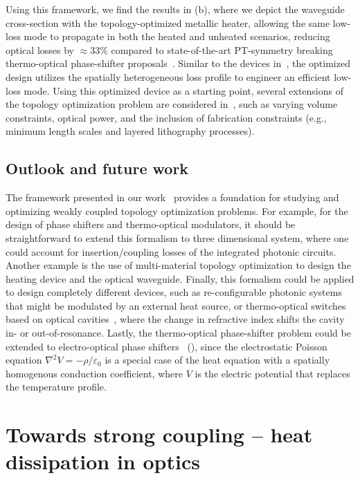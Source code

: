 Using this framework, we find the results in  (b), where we depict the waveguide cross-section with the topology-optimized metallic heater,
allowing the same low-loss mode to propagate in both the heated and unheated scenarios,
reducing optical losses by $\approx 33 \%$ compared to state-of-the-art PT-symmetry breaking thermo-optical phase-shifter proposals~\cite{lipson}. Similar to the devices
in~\cite{lipson}, the optimized design utilizes the spatially heterogeneous loss profile to engineer an efficient low-loss mode. Using this optimized device as a starting point, several extensions of the topology optimization problem are considered in~\cite{ownpub0}, such as varying volume constraints, optical power, and the inclusion of fabrication constraints (e.g., minimum length scales and layered 
lithography processes).

\subsection*{Outlook and future work}

The framework presented in our work~\cite{ownpub0} provides a foundation for studying and optimizing weakly coupled topology optimization problems. For example, for the design of phase shifters and thermo-optical modulators, it should be straightforward to extend this
formalism to three dimensional system, where one could account for insertion/coupling losses of the integrated photonic circuits. Another example is the use of multi-material topology optimization to design the heating device and the optical waveguide. Finally, this formalism could be applied to design completely different devices, such as re-configurable photonic systems that might be modulated by an external heat source, or thermo-optical
switches based on optical cavities~\cite{switch, switch_2}, where the change in refractive index shifts the cavity in- or out-of-resonance. Lastly, the thermo-optical phase-shifter problem could be
extended to electro-optical phase shifters~\cite{pockels} (), since the electrostatic Poisson equation $\nabla^2 V = -\rho/\varepsilon_0$ is a special case of the heat equation with a spatially homogenous
conduction coefficient, where $V$ is the electric potential that replaces the temperature profile. 

\section{Towards strong coupling -- heat dissipation in optics}\label{sec:thermo_strong_coupling}

